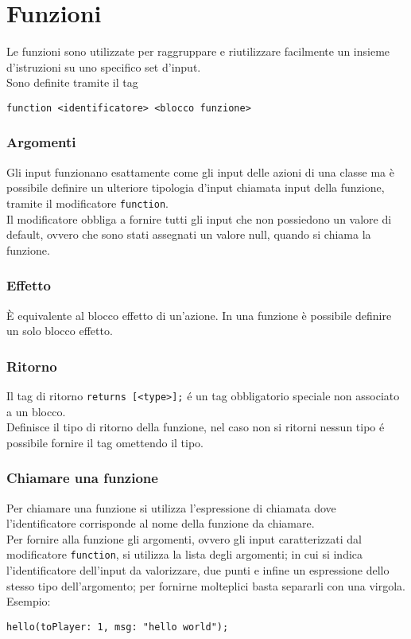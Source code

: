 \section{Funzioni}
Le funzioni sono utilizzate per raggruppare e riutilizzare facilmente un insieme d'istruzioni 
su uno specifico set d'input. \\ 
Sono definite tramite il tag 
\begin{lstlisting}
function <identificatore> <blocco funzione>
\end{lstlisting}

\subsubsection{Argomenti} \label{ModificatoreFunction}
Gli input funzionano esattamente come gli input delle azioni di una classe ma è 
possibile definire un ulteriore tipologia d'input chiamata input della funzione,
tramite il modificatore \lstinline|function|. \\
Il modificatore obbliga a fornire tutti gli input che non possiedono un valore di default,
ovvero che sono stati assegnati un valore null, quando si chiama la funzione.

\subsubsection{Effetto}
È equivalente al blocco effetto di un’azione. 
In una funzione è possibile definire un solo blocco effetto.

\subsubsection{Ritorno}
Il tag di ritorno \lstinline|returns [<type>];| é un tag obbligatorio speciale non associato a un blocco. \\
Definisce il tipo di ritorno della funzione, nel caso non si ritorni nessun tipo é possibile 
fornire il tag omettendo il tipo.

\subsubsection{Chiamare una funzione} \label{ChiamataFunzione}
Per chiamare una funzione si utilizza l'espressione di chiamata dove l'identificatore corrisponde al nome
della funzione da chiamare. \\
Per fornire alla funzione gli argomenti, ovvero gli input caratterizzati dal modificatore \lstinline|function|, si 
utilizza la lista degli argomenti; in cui si indica l'identificatore dell'input da valorizzare, due punti e 
infine un espressione dello stesso tipo dell'argomento; per fornirne molteplici basta separarli con una virgola. Esempio:
\begin{lstlisting}
hello(toPlayer: 1, msg: "hello world");
\end{lstlisting}


